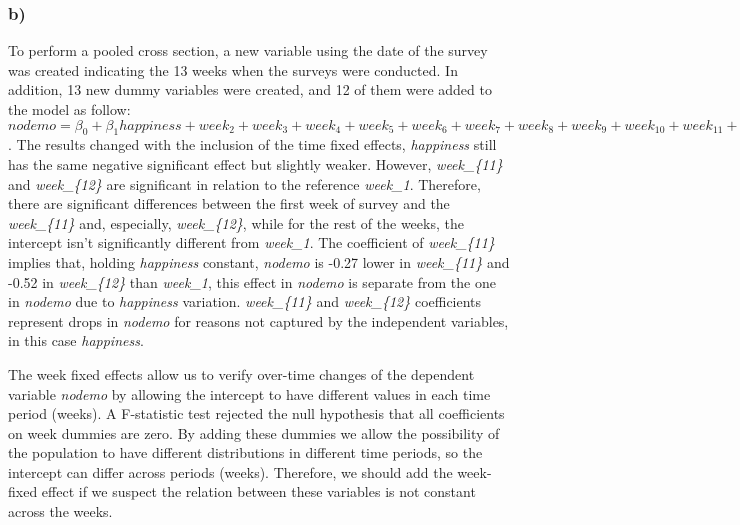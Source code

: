 \documentclass[
]{article}
\begin{document}
\hypertarget{b}{%
\subsubsection{b)}\label{b}}

To perform a pooled cross section, a new variable using the date of the
survey was created indicating the 13 weeks when the surveys were
conducted. In addition, 13 new dummy variables were created, and 12 of
them were added to the model as follow:
\(nodemo = \beta_0 +\beta_1happiness+week_2+ week_3+ week_4+ week_5+ week_6+ week_7+ week_8+ week_9+ week_{10}+ week_{11}+ week_{12}+ week_{13}+ u\).
The results changed with the inclusion of the time fixed effects,
\emph{happiness} still has the same negative significant effect but
slightly weaker. However, \emph{week\_\{11\}} and \emph{week\_\{12\}}
are significant in relation to the reference \emph{week\_1}. Therefore,
there are significant differences between the first week of survey and
the \emph{week\_\{11\}} and, especially, \emph{week\_\{12\}}, while for
the rest of the weeks, the intercept isn't significantly different from
\emph{week\_1}. The coefficient of \emph{week\_\{11\}} implies that,
holding \emph{happiness} constant, \emph{nodemo} is -0.27 lower in
\emph{week\_\{11\}} and -0.52 in \emph{week\_\{12\}} than
\emph{week\_1}, this effect in \emph{nodemo} is separate from the one in
\emph{nodemo} due to \emph{happiness} variation. \emph{week\_\{11\}} and
\emph{week\_\{12\}} coefficients represent drops in \emph{nodemo} for
reasons not captured by the independent variables, in this case
\emph{happiness}.

The week fixed effects allow us to verify over-time changes of the
dependent variable \emph{nodemo} by allowing the intercept to have
different values in each time period (weeks). A F-statistic test
rejected the null hypothesis that all coefficients on week dummies are
zero. By adding these dummies we allow the possibility of the population
to have different distributions in different time periods, so the
intercept can differ across periods (weeks). Therefore, we should add
the week-fixed effect if we suspect the relation between these variables
is not constant across the weeks.
\end{document}
